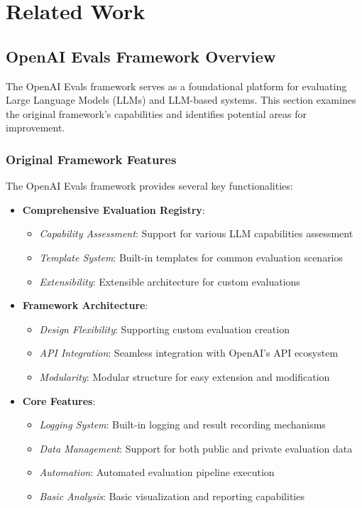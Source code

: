 \section{Related Work}

\subsection{OpenAI Evals Framework Overview}
The OpenAI Evals framework serves as a foundational platform for evaluating Large Language Models (LLMs) and LLM-based systems. This section examines the original framework's capabilities and identifies potential areas for improvement.

\vspace{0.5em}
\subsubsection{Original Framework Features}
The OpenAI Evals framework provides several key functionalities:
\begin{itemize}
    \item \textbf{Comprehensive Evaluation Registry}:
    \begin{itemize}
        \item \textit{Capability Assessment}: Support for various LLM capabilities assessment
        \item \textit{Template System}: Built-in templates for common evaluation scenarios
        \item \textit{Extensibility}: Extensible architecture for custom evaluations
    \end{itemize}
    
    \item \textbf{Framework Architecture}:
    \begin{itemize}
        \item \textit{Design Flexibility}: Supporting custom evaluation creation
        \item \textit{API Integration}: Seamless integration with OpenAI's API ecosystem
        \item \textit{Modularity}: Modular structure for easy extension and modification
    \end{itemize}
    
    \item \textbf{Core Features}:
    \begin{itemize}
        \item \textit{Logging System}: Built-in logging and result recording mechanisms
        \item \textit{Data Management}: Support for both public and private evaluation data
        \item \textit{Automation}: Automated evaluation pipeline execution
        \item \textit{Basic Analysis}: Basic visualization and reporting capabilities
    \end{itemize}
\end{itemize}

